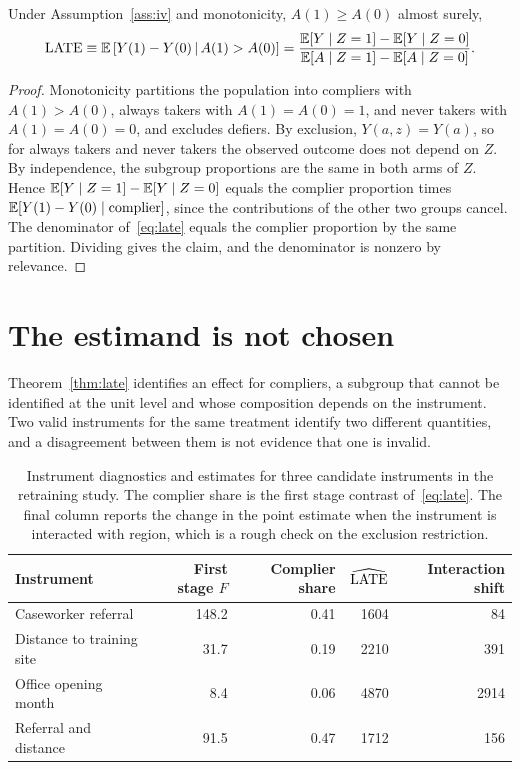 \begin{theorem}
\label{thm:late}
Under Assumption~\ref{ass:iv} and monotonicity, $A(1) \geq A(0)$ almost surely,
\begin{equation}
  \mathrm{LATE} \equiv \mathbb{E}\left[ Y(1) - Y(0) \,\middle|\, A(1) > A(0) \right]
    = \frac{\mathbb{E}[Y \mid Z=1] - \mathbb{E}[Y \mid Z=0]}{\mathbb{E}[A \mid Z=1] - \mathbb{E}[A \mid Z=0]}.
  \label{eq:late}
\end{equation}
\end{theorem}

\begin{proof}
Monotonicity partitions the population into compliers with $A(1) > A(0)$, always
takers with $A(1) = A(0) = 1$, and never takers with $A(1) = A(0) = 0$, and
excludes defiers. By exclusion, $Y(a,z) = Y(a)$, so for always takers and never
takers the observed outcome does not depend on $Z$. By independence, the
subgroup proportions are the same in both arms of $Z$. Hence
$\mathbb{E}[Y \mid Z=1] - \mathbb{E}[Y \mid Z=0]$ equals the complier proportion times
$\mathbb{E}[Y(1) - Y(0) \mid \text{complier}]$, since the contributions of the other two
groups cancel. The denominator of~\eqref{eq:late} equals the complier proportion
by the same partition. Dividing gives the claim, and the denominator is nonzero
by relevance.
\end{proof}

\section{The estimand is not chosen}
\label{sec:design-late}

Theorem~\ref{thm:late} identifies an effect for compliers, a subgroup that
cannot be identified at the unit level and whose composition depends on the
instrument. Two valid instruments for the same treatment identify two different
quantities, and a disagreement between them is not evidence that one is invalid.

\begin{table}[t]
\centering
\caption[Instrument diagnostics and estimates]{Instrument diagnostics and
estimates for three candidate instruments in the retraining study. The complier
share is the first stage contrast of~\eqref{eq:late}. The final column reports
the change in the point estimate when the instrument is interacted with region,
which is a rough check on the exclusion restriction.}
\label{tab:iv-comparison}
\begin{tabular}{lrrrr}
\toprule
Instrument & First stage $F$ & Complier share & $\widehat{\mathrm{LATE}}$ & Interaction shift \\
\midrule
Caseworker referral        & 148.2 & 0.41 & 1604 & 84  \\
Distance to training site  & 31.7  & 0.19 & 2210 & 391 \\
Office opening month       & 8.4   & 0.06 & 4870 & 2914 \\
Referral and distance      & 91.5  & 0.47 & 1712 & 156 \\
\bottomrule
\end{tabular}
\end{table}

